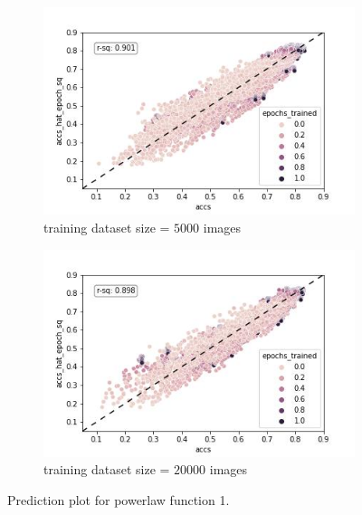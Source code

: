\documentclass{article} %
\begin{document}
\begin{figure}
    \begin{subfigure}{.5\textwidth}
        \centering
        \includegraphics[width=.8\linewidth]{powerlaw_train_accs_hat_epoch_sq}
        \caption{training dataset size = $5000$ images}
        \label{fig:powerlaw_acc_hat_epoch_sq_train}
    \end{subfigure}%
    \begin{subfigure}{.5\textwidth}
        \centering
        \includegraphics[width=.8\linewidth]{powerlaw_val_accs_hat_epoch_sq}
        \caption{training dataset size = $20000$ images}
        \label{fig:powerlaw_acc_hat_epoch_sq_val}
    \end{subfigure}
    \caption{Prediction plot for powerlaw function 1.}
    \label{fig:powerlaw_acc_hat_epoch_sq}
\end{figure}
\end{document}
